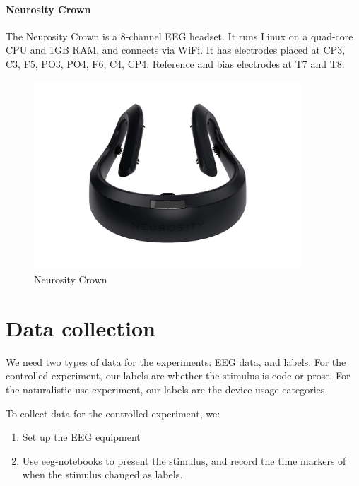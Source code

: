     \begin{minipage}{\textwidth}
        \paragraph*{Neurosity Crown}
        The Neurosity Crown is a 8-channel EEG headset. It runs Linux on a quad-core CPU and 1GB RAM, and connects via WiFi. It has electrodes placed at CP3, C3, F5, PO3, PO4, F6, C4, CP4. Reference and bias electrodes at T7 and T8.

        \begin{figure}[H]
            \centering
            \includegraphics[trim=0 100 0 100,clip,width=100mm]{img/crown-1.png}
            \caption{Neurosity Crown}\label{fig:crown}
        \end{figure}
    \end{minipage}

\pagebreak
\section{Data collection}

We need two types of data for the experiments: EEG data, and labels. For the controlled experiment, our labels are whether the stimulus is code or prose. For the naturalistic use experiment, our labels are the device usage categories.

To collect data for the controlled experiment, we:

\begin{enumerate}
    \item Set up the EEG equipment
    \item Use eeg-notebooks to present the stimulus, and record the time markers of when the stimulus changed as labels.
\end{enumerate}

